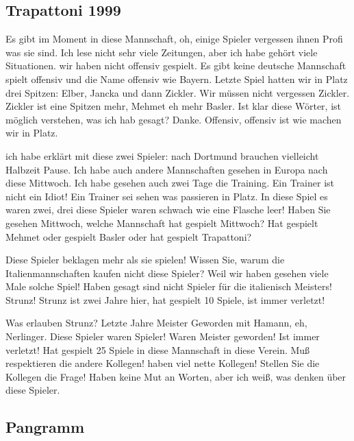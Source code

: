 \subsection{Trapattoni 1999}\label{subsec:trapattoni}
%
\begin{myenumerate}
\item
Es gibt im Moment in diese Mannschaft, oh, einige Spieler vergessen ihnen Profi was sie sind. 
Ich lese nicht sehr viele Zeitungen, aber ich habe gehört viele Situationen. 
wir haben nicht offensiv gespielt. 
Es gibt keine deutsche Mannschaft spielt offensiv und die Name offensiv wie Bayern. 
Letzte Spiel hatten wir in Platz drei Spitzen: Elber, Jancka und dann Zickler. 
Wir müssen nicht vergessen Zickler. 
Zickler ist eine Spitzen mehr, Mehmet eh mehr Basler. 
Ist klar diese Wörter, ist möglich verstehen, was ich hab gesagt? Danke. 
Offensiv, offensiv ist wie machen wir in Platz. 

\item
ich habe erklärt mit diese zwei Spieler: nach Dortmund brauchen vielleicht Halbzeit Pause. Ich habe auch andere Mannschaften gesehen in Europa nach diese Mittwoch. Ich habe gesehen auch zwei Tage die Training. Ein Trainer ist nicht ein Idiot! Ein Trainer sei sehen was passieren in Platz. In diese Spiel es waren zwei, drei diese Spieler waren schwach wie eine Flasche leer! Haben Sie gesehen Mittwoch, welche Mannschaft hat gespielt Mittwoch? Hat gespielt Mehmet oder gespielt Basler oder hat gespielt Trapattoni? 

\item
Diese Spieler beklagen mehr als sie spielen! 
Wissen Sie, warum die Italienmannschaften kaufen nicht diese Spieler? 
Weil wir haben gesehen viele Male solche Spiel! 
Haben gesagt sind nicht Spieler für die italienisch Meisters! Strunz! 
Strunz ist zwei Jahre hier, hat gespielt 10 Spiele, ist immer verletzt! 

\item
Was erlauben Strunz? Letzte Jahre Meister Geworden mit Hamann, eh, Nerlinger. 
Diese Spieler waren Spieler! Waren Meister geworden! Ist immer verletzt! 
Hat gespielt 25 Spiele in diese Mannschaft in diese Verein. 
Muß respektieren die andere Kollegen! haben viel nette Kollegen! 
Stellen Sie die Kollegen die Frage!
Haben keine Mut an Worten, aber ich weiß, was denken über diese Spieler. 

\end{myenumerate}

\subsection{Pangramm}\label{subsec:pangramm}


